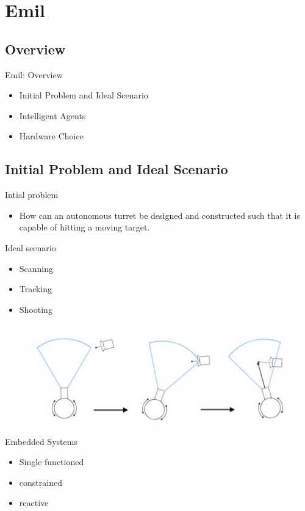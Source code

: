 \section{Emil}
\subsection{Overview}
\begin{frame}{Emil: Overview}
\begin{itemize}
  \item Initial Problem and Ideal Scenario
  \item Intelligent Agents
  \item Hardware Choice
\end{itemize}
\end{frame}
 
\subsection{Initial Problem and Ideal Scenario}
\begin{frame}{Intial problem}
\begin{itemize}
\item How can an autonomous turret be designed and constructed such
that it is capable of hitting a moving target.
\end{itemize}
\end{frame}

\begin{frame}{Ideal scenario}
\begin{itemize}
  \item Scanning
  \item Tracking
  \item Shooting
\end{itemize}
\begin{figure}
  \includegraphics[scale=0.6]{figures/ideal.JPG}
\end{figure}
\end{frame}

\begin{frame}{Embedded Systems}
\begin{itemize}
  \item Single functioned
  \item constrained
  \item reactive
\end{itemize}
\end{frame}

